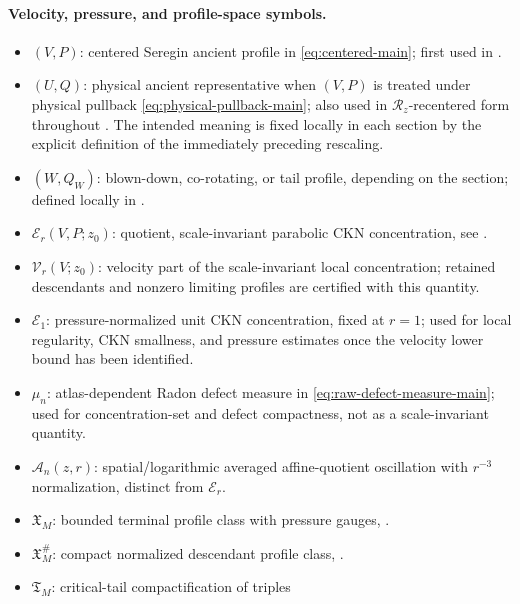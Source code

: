 \documentclass[11pt]{amsart}
\numberwithin{equation}{section}
\theoremstyle{plain}
\theoremstyle{definition}
\theoremstyle{remark}
\newcommand{\calR}{\mathcal R}
\newcommand{\calE}{\mathcal E}
\newcommand{\Vel}{\mathcal V}
\newcommand{\Tcrit}{\mathfrak T_M}
\begin{document}
\paragraph{Velocity, pressure, and profile-space symbols.}
\begin{itemize}[leftmargin=1.6em]
   \item \((V,P)\): centered Seregin ancient profile in \eqref{eq:centered-main};
      first used in .
   \item \((U,Q)\): physical ancient representative when \((V,P)\) is treated
      under physical pullback \eqref{eq:physical-pullback-main}; also used in
      \(\calR_z\)-recentered form throughout
      .  The intended
      meaning is fixed locally in each section by the explicit definition of
      the immediately preceding rescaling.
   \item \((W,Q_W)\): blown-down, co-rotating, or tail profile, depending on
      the section; defined locally in
      .
   \item \(\calE_r(V,P;z_0)\): quotient, scale-invariant parabolic CKN
      concentration, see .
   \item \(\Vel_r(V;z_0)\): velocity part of the scale-invariant local
      concentration; retained descendants and nonzero limiting profiles are
      certified with this quantity.
   \item \(\calE_1\): pressure-normalized unit CKN concentration, fixed at
      \(r=1\); used for local regularity, CKN smallness, and pressure estimates
      once the velocity lower bound has been identified.
   \item \(\mu_n\): atlas-dependent Radon defect measure in
      \eqref{eq:raw-defect-measure-main}; used for concentration-set and defect
      compactness, not as a scale-invariant quantity.
   \item \(\mathcal A_n(z,r)\): spatial/logarithmic averaged affine-quotient
      oscillation with \(r^{-3}\) normalization, distinct from \(\calE_r\).
   \item \(\mathfrak X_M\): bounded terminal profile class with pressure gauges,
      .
   \item \(\mathfrak X_M^\#\): compact normalized descendant profile class,
      .
   \item \(\Tcrit\): critical-tail compactification of triples

\end{itemize}
\end{document}
